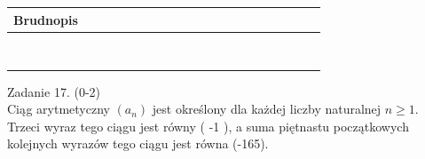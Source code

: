 \documentclass[10pt]{article}
\begin{document}
\begin{center}
\begin{tabular}{|c|c|c|c|c|c|c|c|c|c|c|c|c|c|c|c|c|c|c|c|c|c|c|c|}
\hline
\multicolumn{5}{|l|}{Brudnopis} &  &  &  &  &  &  &  &  &  &  &  &  &  &  &  &  &  &  &  \\
\hline
 &  &  &  &  &  &  &  &  &  &  &  &  &  &  &  &  &  &  &  &  &  &  &  \\
\hline
 &  &  &  &  &  &  &  &  &  &  &  &  &  &  &  &  &  &  &  &  &  &  &  \\
\hline
 &  &  &  &  &  &  &  &  &  &  &  &  &  &  &  &  &  &  &  &  &  &  &  \\
\hline
 &  &  &  &  &  &  &  &  &  &  &  &  &  &  &  &  &  &  &  &  &  &  &  \\
\hline
 &  &  &  &  &  &  &  &  &  &  &  &  &  &  &  &  &  &  &  &  &  &  &  \\
\hline
 &  &  &  &  &  &  &  &  &  &  &  &  &  &  &  &  &  &  &  &  &  &  &  \\
\hline
 &  &  &  &  &  &  &  &  &  &  &  &  &  &  &  &  &  &  &  &  &  &  &  \\
\hline
 &  &  &  &  &  &  &  &  &  &  &  &  &  &  &  &  &  &  &  &  &  &  &  \\
\hline
\end{tabular}
\end{center}

Zadanie 17. (0-2)\\
Ciąg arytmetyczny \(\left(a_{n}\right)\) jest określony dla każdej liczby naturalnej \(n \geq 1\). Trzeci wyraz tego ciągu jest równy ( -1 ), a suma piętnastu początkowych kolejnych wyrazów tego ciągu jest równa (-165).
\end{document}
